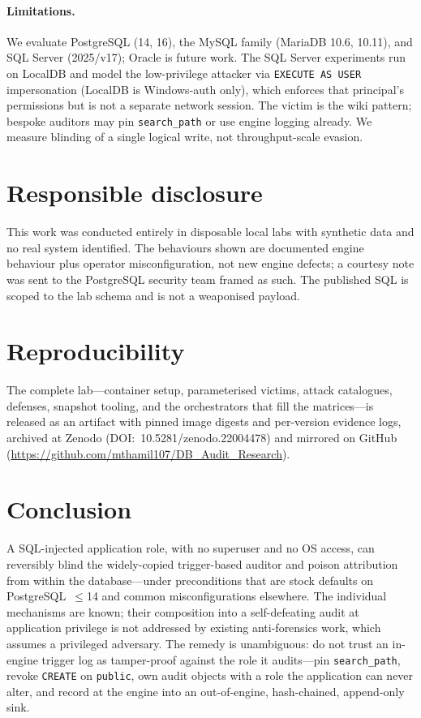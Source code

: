 \documentclass[11pt]{article}
\newcommand{\code}[1]{\texttt{#1}}
\begin{document}
\paragraph{Limitations.} We evaluate PostgreSQL (14, 16), the MySQL family (MariaDB 10.6,
10.11), and SQL Server (2025/v17); Oracle is future work. The SQL Server experiments run on
LocalDB and model the low-privilege attacker via \code{EXECUTE AS USER} impersonation
(LocalDB is Windows-auth only), which enforces that principal's permissions but is not a
separate network session. The victim is the wiki pattern; bespoke auditors may pin
\code{search\_path} or use engine logging already. We measure blinding of a single logical
write, not throughput-scale evasion.

\section{Responsible disclosure}
This work was conducted entirely in disposable local labs with synthetic data and no real
system identified. The behaviours shown are documented engine behaviour plus operator
misconfiguration, not new engine defects; a courtesy note was sent to the PostgreSQL
security team framed as such. The published SQL is scoped to the lab schema and is not a
weaponised payload.

\section{Reproducibility}
The complete lab---container setup, parameterised victims, attack catalogues, defenses,
snapshot tooling, and the orchestrators that fill the matrices---is released as an artifact
with pinned image digests and per-version evidence logs, archived at Zenodo
(DOI:~10.5281/zenodo.22004478) and mirrored on GitHub
(\url{https://github.com/mthamil107/DB_Audit_Research}).

\section{Conclusion}
A SQL-injected application role, with no superuser and no OS access, can reversibly blind
the widely-copied trigger-based auditor and poison attribution from within the
database---under preconditions that are stock defaults on PostgreSQL~$\leq$14 and common
misconfigurations elsewhere. The individual mechanisms are known; their composition into a
self-defeating audit at application privilege is not addressed by existing anti-forensics
work, which assumes a privileged adversary. The remedy is unambiguous: do not trust an
in-engine trigger log as tamper-proof against the role it audits---pin \code{search\_path},
revoke \code{CREATE} on \code{public}, own audit objects with a role the application can
never alter, and record at the engine into an out-of-engine, hash-chained, append-only sink.
\end{document}
